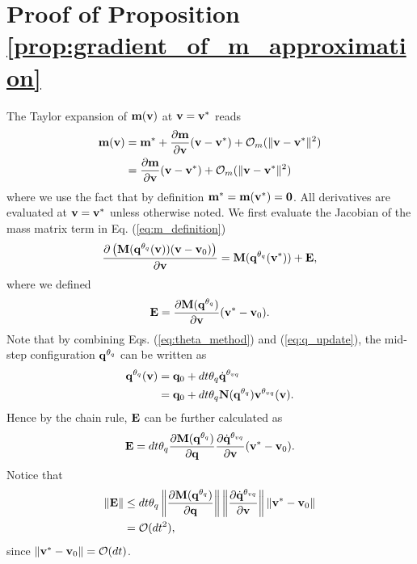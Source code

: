 \section{Proof of Proposition \ref{prop:gradient_of_m_approximation}}
\label{app:gradient_of_m_approximation}

The Taylor expansion of ${\mathbf{m}}({\mathbf{v}})$ at ${\mathbf{v}}={\mathbf{v}}^*$ reads
\begin{align}
	\mf{m}(\mf{v}) &= \mf{m}^* + \frac{\partial \mf{m}}{\partial \mf{v}} (\mf{v}-\mf{v}^*) +
	\mathcal{O}_m(\Vert\mf{v}-\mf{v}^*\Vert^2)\nonumber\\
	&=\frac{\partial \mf{m}}{\partial \mf{v}}(\mf{v}-\mf{v}^*) +
	\mathcal{O}_m(\Vert\mf{v}-\mf{v}^*\Vert^2)
	\label{eq:m_taylor_expansion}
\end{align}
where we use the fact that by definition ${\mathbf{m}}^*={\mathbf{m}}({\mathbf{v}}^*)={\mathbf{0}}$. All
derivatives are evaluated at ${\mathbf{v}} = {\mathbf{v}}^*$ unless otherwise noted. We
first evaluate the Jacobian of the mass matrix term in Eq.
(\ref{eq:m_definition})
\begin{align*}
	\frac{\partial \left( {\mathbf{M}}({\mathbf{q}}^{\theta_{q}}({\mathbf{v}}))({\mathbf{v}}-{\mathbf{v}}_0) \right)}{\partial {\mathbf{v}}}
	= {\mathbf{M}}({\mathbf{q}}^{\theta_{q}}({\mathbf{v}}^*)) + {\mathbf{E}},
\end{align*}
where we defined
\begin{align*}
	{\mathbf{E}} = \frac{\partial {\mathbf{M}}({\mathbf{q}}^{\theta_{q}})}{\partial{\mathbf{v}}} ({\mathbf{v}}^*-{\mathbf{v}}_0).
\end{align*}
Note that by combining Eqs. (\ref{eq:theta_method}) and (\ref{eq:q_update}), the
mid-step configuration ${\mathbf{q}}^{\theta_q}$ can be written as
\begin{align*}
	{\mathbf{q}}^{\theta_q}({\mathbf{v}}) &= {\mathbf{q}}_0 + dt \theta_q \dot{{\mathbf{q}}}^{\theta_{vq}} \\
	                          &= {\mathbf{q}}_0 + dt \theta_q {\mathbf{N}}({\mathbf{q}}^{\theta_{q}}){\mathbf{v}}^{\theta_{vq}}({\mathbf{v}}).
\end{align*}
Hence by the chain rule, ${\mathbf{E}}$ can be further calculated as
\begin{align*}
	{\mathbf{E}} = dt\theta_q\frac{\partial {\mathbf{M}}({\mathbf{q}}^{\theta_{q}}) }{\partial{\mathbf{q}}}
             \frac{\partial\dot{{\mathbf{q}}}^{\theta_{vq}}}{\partial{\mathbf{v}}}
			 ({\mathbf{v}}^*-{\mathbf{v}}_0).
\end{align*}
Notice that 
\begin{align*}
		\Vert{\mathbf{E}}\Vert 
		&\le dt\theta_q \left\| \frac{\partial{\mathbf{M}}({\mathbf{q}}^{\theta_{q}})}{\partial{\mathbf{q}}}  \right\|
			\left\| \frac{\partial\dot{{\mathbf{q}}}^{\theta_{vq}}}{\partial{\mathbf{v}}}  \right\|
		    \left\| {\mathbf{v}}^*-{\mathbf{v}}_0 \right\| \\
		&= \mathcal{O}(dt^2),
\end{align*}
since $\Vert{\mathbf{v}}^*-{\mathbf{v}}_0\Vert = \mathcal{O}(dt)$.

